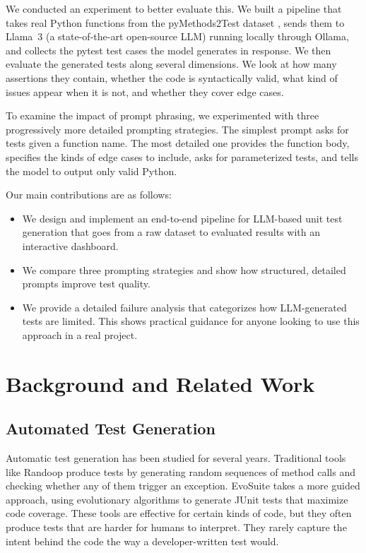 \documentclass[conference]{IEEEtran}
\begin{document}
We conducted an experiment to better evaluate this. We built a pipeline that takes real Python functions from the pyMethods2Test dataset \cite{tufano2022methods2test}, sends them to Llama~3 (a state-of-the-art open-source LLM) running locally through Ollama, and collects the pytest test cases the model generates in response. We then evaluate the generated tests along several dimensions. We look at how many assertions they contain, whether the code is syntactically valid, what kind of issues appear when it is not, and whether they cover edge cases. 

To examine the impact of prompt phrasing, we experimented with three progressively more detailed prompting strategies. The simplest prompt asks for tests given a function name. The most detailed one provides the function body, specifies the kinds of edge cases to include, asks for parameterized tests, and tells the model to output only valid Python.

Our main contributions are as follows:

\begin{itemize}[leftmargin=*]
    \item We design and implement an end-to-end pipeline for LLM-based unit test generation that goes from a raw dataset to evaluated results with an interactive dashboard.
    \item We compare three prompting strategies and show how structured, detailed prompts improve test quality.
    \item We provide a detailed failure analysis that categorizes how LLM-generated tests are limited. This shows practical guidance for anyone looking to use this approach in a real project.
\end{itemize}

\section{Background and Related Work}

\subsection{Automated Test Generation}

Automatic test generation has been studied for several years. Traditional tools like Randoop \cite{pacheco2007randoop} produce tests by generating random sequences of method calls and checking whether any of them trigger an exception. EvoSuite \cite{fraser2011evosuite} takes a more guided approach, using evolutionary algorithms to generate JUnit tests that maximize code coverage. These tools are effective for certain kinds of code, but they often produce tests that are harder for humans to interpret. They rarely capture the intent behind the code the way a developer-written test would.
\end{document}
